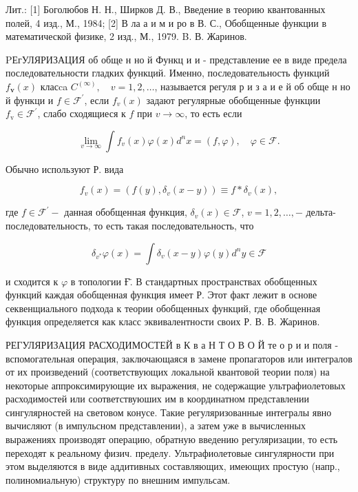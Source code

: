 \documentclass[10pt]{article}
\begin{document}
Лит.: [1] Боголюбов Н. Н., Ширков Д. В., Введение в теорию квантованных полей, 4 изд., М., 1984; [2] В ла а и м и ро в В. С., Обобщенные функции в математической физике, 2 изд., М., 1979. B. В. Жаринов.



PЕгУЛЯРИЗАЦИЯ об обще н но й Функц и и - представление ее в виде предела последовательности гладких функций. Именно, последовательность функций $f_{\mathbf{v}}(x)$ класca $C^{(\infty)}, \quad v=1,2, \ldots$, называется регуля р и з а и е й об обще н но й функци и $f \in \mathscr{F}^{\prime}$, если $f_{v}(x)$ задают регулярные обобщенные функции $f_{\mathrm{v}} \in \mathscr{F}^{\prime}$, слабо сходящиеся к $f$ при $v \rightarrow \infty$, то есть если



\[

\lim _{v \rightarrow \infty} \int f_{v}(x) \varphi(x) d^{n} x=(f, \varphi), \quad \varphi \in \mathscr{F} .

\]



Обычно используют Р. вида



\[

f_{v}(x)=\left(f(y), \delta_{v}(x-y)\right) \equiv f * \delta_{v}(x),

\]



где $f \in \mathscr{F}^{\prime}-$ данная обобщенная функция, $\delta_{v}(x) \in \mathscr{F}$, $v=1,2, \ldots,-$ дельта-последовательность, то есть такая последовательность, что



\[

\delta_{v^{*}} \varphi(x)=\int \delta_{v}(x-y) \varphi(y) d^{n} y \in \mathscr{F}

\]



и сходится к $\varphi$ в топологии Ғ̈. В стандартных пространствах обобщенных функций каждая обобщенная функция имеет Р. Этот факт лежит в основе секвенщиального подхода к теории обобщенных функций, где обобщенная функция определяется как класс эквивалентности своих Р. В. В. Жаринов.



РЕГУЛЯРИЗАЦИЯ РАСХОДИМОСТЕЙ в К в а Н Т О В О Й те о р и и поля - вспомогательная операция, заключающаяся в замене пропагаторов или интегралов от их произведений (соответствующих локальной квантовой теории поля) на некоторые аппроксимирующие их выражения, не содержащие ультрафиолетовых расходимостей или соответствуюших им в координатном представлении сингулярностей на световом конусе. Такие регуляризованные интегралы явно вычисляют (в импульсном представлении), а затем уже в вычисленных выражениях производят операцию, обратную введению регуляризации, то есть переходят к реальному физич. пределу. Ультрафиолетовые сингулярности при этом выделяются в виде аддитивных составляющих, имеющих простую (напр., полиномиальную) структуру по внешним импульсам.
\end{document}
